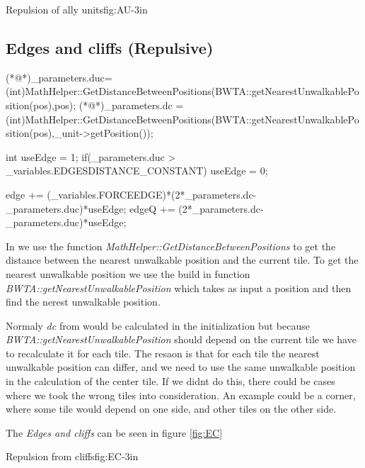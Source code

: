 			{Repulsion of ally units}{fig:AU}{-3in}

	\subsection{Edges and cliffs (Repulsive)}
	\begin{Sourcecode}[caption=Edges and cliffs]
(*@\lnote@*)_parameters.duc= (int)MathHelper::GetDistanceBetweenPositions(BWTA::getNearestUnwalkablePosition(pos),pos);
(*@\lnote@*)_parameters.dc = (int)MathHelper::GetDistanceBetweenPositions(BWTA::getNearestUnwalkablePosition(pos),_unit->getPosition());

int useEdge = 1;
if(_parameters.duc > _variables.EDGESDISTANCE_CONSTANT)
	useEdge = 0;

edge += (_variables.FORCEEDGE)*(2*_parameters.dc-_parameters.duc)*useEdge;
edgeQ += (2*_parameters.dc-_parameters.duc)*useEdge;
\end{Sourcecode}	
    In  we use the function \textit{MathHelper::GetDistanceBetweenPositions} to get the distance between the nearest unwalkable position and the current tile. To get the nearest unwalkable position we use the build in function \textit{BWTA::getNearestUnwalkablePosition} which takes as input a position and then find the nerest unwalkable position.

	
	Normaly \textit{dc} from  would be calculated in the initialization but because \\ \textit{BWTA::getNearestUnwalkablePosition} should depend on the current tile we have to recalculate it for each tile. The resaon is that for each tile the nearest unwalkable position can differ, and we need to use the same unwalkable position in the calculation of the center tile. If we didnt do this, there could be cases where 
	we took the wrong tiles into consideration. An example could be a corner, where some tile would depend on one side, and other tiles on the other side.
	
	The \textit{Edges and cliffs} can be seen in figure \ref{fig:EC}

			{Repulsion from cliffs}{fig:EC}{-3in}
